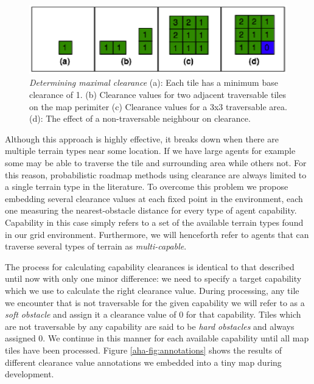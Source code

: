 \begin{figure}[htbp]
        \caption{\emph{Determining maximal clearance} (a): Each tile has a minimum base clearance of 1. (b) Clearance values for two adjacent traversable tiles on the map perimiter (c) Clearance values for a 3x3 traversable area. (d): The effect of a non-traversable neighbour on clearance. }
        \begin{center}
                        \includegraphics[scale=0.5]{diagrams/calculatingclearance.eps}
        \end{center}
        \label{aha-fig:calculatingclearance}
\end{figure}

Although this approach is highly effective, it breaks down when there are multiple terrain types near some location. If we have large agents for example some may be able to traverse the tile and surrounding area while others not. For this reason, probabilistic roadmap methods using clearance are always limited to a single terrain type in the literature. To overcome this problem we propose embedding several clearance values at each fixed point in the environment, each one measuring the nearest-obstacle distance for every type of agent capability.  Capability in this case simply refers to a set of the available terrain types found in our grid environment. Furthermore, we will henceforth refer to agents that can traverse several types of terrain as \emph{multi-capable}.

The process for calculating capability clearances is identical to that described until now with only one minor difference: we need to specify a target capability which we use to calculate the right clearance value. During processing, any tile we encounter that is not traversable for the given capability we will refer to as a \emph{soft obstacle} and assign it a clearance value of 0 for that capability. Tiles which are not traversable by any capability are said to be \emph{hard obstacles} and always assigned 0.  We continue in this manner for each available capability until all map tiles have been processed. Figure \ref{aha-fig:annotations} shows the results of different clearance value annotations we embedded into a tiny map during development.

